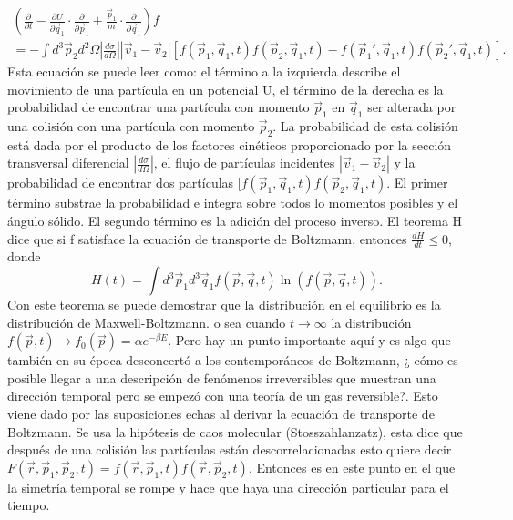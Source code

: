 \begin{align*}
(\frac{\partial}{\partial t}- \frac{\partial U}{\partial \vec{q}_{1}} \cdot \frac{\partial}{\partial \vec{p}_{1}} +\frac{\vec{p}_{1}}{m} \cdot \frac{\partial}{\partial \vec{q}_{1}})f 
\\
=- \int d^{3}\vec{p}_{2}d^{2} \Omega |\frac{d \sigma}{d \Omega}| |\vec{v}_{1}-\vec{v}_{2}|[f(\vec{p}_{1},\vec{q}_{1},t)f(\vec{p}_{2},\vec{q}_{1},t) - f(\vec{p}_{1}',\vec{q}_{1},t)f(\vec{p}_{2}',\vec{q}_{1},t)].
\end{align*}
Esta ecuación se puede leer como: el término a la izquierda describe el movimiento de una partícula en un potencial U, el término de la derecha es la probabilidad de encontrar una partícula con momento $\vec{p}_{1}$ en $\vec{q}_{1}$ ser alterada por una colisión con una partícula con momento $\vec{p}_{2}$.  La probabilidad de esta colisión está dada por el producto de los factores cinéticos proporcionado por la sección transversal diferencial $ |\frac{d \sigma}{d \Omega}|$, el flujo de partículas incidentes $|\vec{v}_{1}-\vec{v}_{2}|$ y la probabilidad de encontrar dos partículas $[f(\vec{p}_{1},\vec{q}_{1},t)f(\vec{p}_{2},\vec{q}_{1},t)$. El primer término substrae la probabilidad e integra sobre todos lo momentos posibles y el ángulo sólido. El segundo término es la adición del proceso inverso. 
El teorema H dice que si f satisface la ecuación de transporte de Boltzmann, entonces $\frac{dH}{dt} \leq 0$, donde 
\begin{equation}
H(t)= \int d^{3} \vec{p}_{1} d^{3} \vec{q}_{1}  f(\vec{p},\vec{q},t) \ln (f(\vec{p},\vec{q},t)).
\end{equation}
Con este teorema se puede demostrar que la distribución en el equilibrio es la distribución de Maxwell-Boltzmann. o sea cuando $t \to \infty$ la distribución  $f(\vec{p},t) \to f_{0}(\vec{p})=  \alpha e^{-\beta E}$. Pero hay un punto importante aquí y es algo que también en su época desconcertó a los contemporáneos de Boltzmann, ¿ cómo es posible llegar a una descripción de fenómenos irreversibles que muestran una dirección temporal pero se empezó con una teoría de un gas reversible?. Esto viene dado por las suposiciones echas al derivar la ecuación de transporte de Boltzmann. Se usa la hipótesis de caos molecular (Stosszahlanzatz), esta dice que después de una colisión las partículas están descorrelacionadas esto quiere decir $F(\vec{r},\vec{p}_{1},\vec{p}_{2},t)=f(\vec{r},\vec{p}_{1},t)f(\vec{r},\vec{p}_{2},t)$. Entonces es en este punto en el que la simetría temporal se rompe y hace que haya una dirección particular para el tiempo. 

